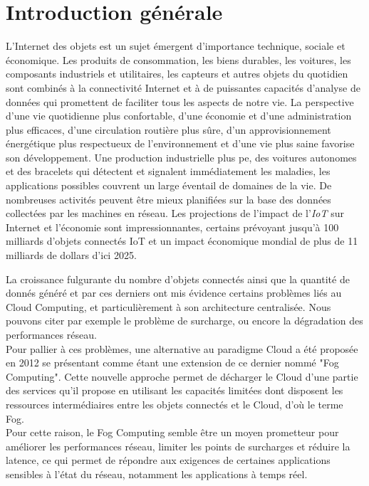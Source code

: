 \chapter{Introduction générale}
L'Internet des objets est un sujet émergent d'importance technique, sociale et économique. Les produits de consommation, les biens durables, les voitures, les composants industriels et utilitaires, les capteurs et autres objets du quotidien sont combinés à la connectivité Internet et à de puissantes capacités d'analyse de données qui promettent de faciliter tous les aspects de notre vie. La perspective d’une vie quotidienne plus confortable, d’une économie et d’une administration plus efficaces, d'une circulation routière plus sûre, d’un approvisionnement énergétique plus respectueux de l'environnement et d’une vie plus saine favorise son développement. Une production industrielle plus pe, des voitures autonomes et des bracelets qui détectent et signalent immédiatement les maladies, les applications possibles couvrent un large éventail de domaines de la vie. De nombreuses activités peuvent être mieux planifiées sur la base des données collectées par les machines en réseau. Les projections de l'impact de l'\emph{IoT} sur Internet et l'économie sont impressionnantes, certains prévoyant jusqu'à 100 milliards d'objets connectés IoT et un impact économique mondial de plus de 11 milliards de dollars d'ici 2025. \par
La croissance fulgurante du nombre d'objets connectés ainsi que la quantité de donnés généré et par ces derniers ont mis évidence certains problèmes liés au Cloud Computing, et particulièrement à son architecture centralisée. Nous pouvons citer par exemple le problème de surcharge, ou encore la dégradation des performances réseau.\\
Pour pallier à ces problèmes, une alternative au paradigme Cloud a été proposée en 2012 se présentant comme étant une extension de ce dernier nommé "Fog Computing". Cette nouvelle approche permet de décharger le Cloud d'une partie des services qu'il propose en utilisant les capacités limitées dont disposent les ressources intermédiaires entre les objets connectés et le Cloud, d'où le terme Fog.\\ 
Pour cette raison, le Fog Computing semble être un moyen prometteur pour améliorer les performances réseau, limiter les points de surcharges et réduire la latence, ce qui permet de répondre aux exigences de certaines applications sensibles à l'état du réseau, notamment les applications à temps réel.\\
